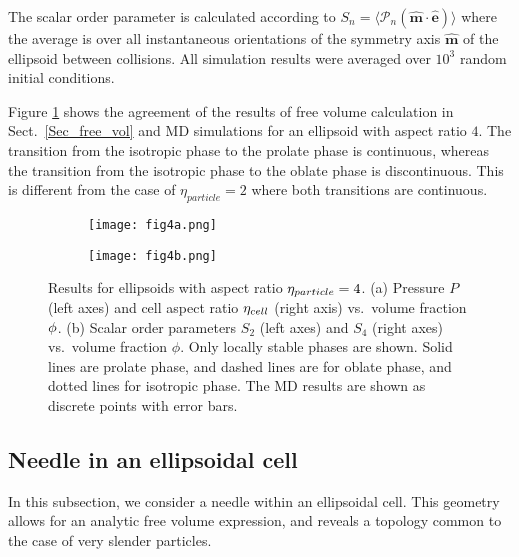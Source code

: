 \documentclass{article}
\begin{document}
The scalar order parameter is calculated according to $S_{n}=\langle \mathcal{P}_{n}(\mathbf{\hat{m}\cdot 
	\hat{e}})\rangle $
where the average is over all instantaneous orientations of the symmetry
axis $\mathbf{\hat{m}}$ of the ellipsoid between collisions. All simulation
results were averaged over $10^{3}$ random initial conditions.

Figure \ref{fig:MD} shows the agreement of the results of free
volume calculation in Sect.~\ref{Sec_free_vol} and MD simulations for an
ellipsoid with aspect ratio $4$. The transition from the isotropic phase to the prolate phase is continuous, whereas the transition from the isotropic phase to the oblate phase is discontinuous. This is different from the case of $\eta_{particle}=2$ where both transitions are continuous. 


\begin{figure}[h]
	\centering
\begin{subfigure}[c]{0.4\linewidth}
	\centering
	\texttt{[image: fig4a.png]}\caption{}
\end{subfigure}
\qquad
\begin{subfigure}[c]{0.4\linewidth}
	\centering
	\texttt{[image: fig4b.png]}\caption{}
\end{subfigure}
\caption{ Results for ellipsoids with aspect ratio $\protect\eta_{particle}
=4$. (a) Pressure $P$ (left axes) and cell aspect ratio $\protect\eta_{cell}$ (right axis) vs.~volume fraction $\protect\phi$. (b) Scalar order parameters $S_2$ (left axes) and $S_4$ (right axes) vs.~volume fraction $\phi$. Only locally stable phases are shown. Solid
lines are prolate phase, and dashed lines are for oblate phase, and dotted lines for isotropic phase.  The MD results are shown as discrete points
with error bars.}
\label{fig:MD}
\end{figure}


\subsection{Needle in an ellipsoidal cell}

\label{Sec_Needle}

In this subsection, we consider a needle within an ellipsoidal cell. This
geometry allows for an analytic free volume expression, and reveals a
topology common to the case of very slender particles.
\end{document}

